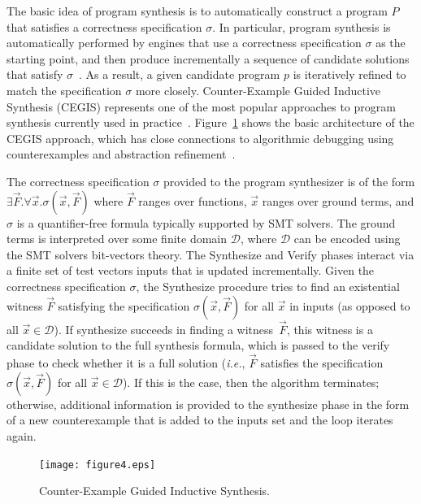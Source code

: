 \documentclass{acm_sen_article}
\begin{document}
The basic idea of program synthesis is to automatically construct a program $P$ that satisfies a correctness specification $\sigma$. In particular, program synthesis is automatically performed by engines that use a correctness specification $\sigma$ as the starting point, and then produce incrementally a sequence of candidate solutions that satisfy $\sigma$~\cite{Abate17}. As a result, a given candidate program $p$ is iteratively refined to match the specification $\sigma$ more closely. Counter-Example Guided Inductive Synthesis (CEGIS) represents one of the most popular approaches to program synthesis currently used in practice~\cite{David15}. Figure~\ref{Counter-Example-Guided-Inductive-Synthesis} shows the basic architecture of the CEGIS approach, which has close connections to algorithmic debugging using counterexamples and abstraction refinement~\cite{Alur13}. 

The correctness specification $\sigma$ provided to the program synthesizer is of the form $\exists \vec{F} .  \forall \vec{x}.  \sigma(\vec{x}, \vec{F})$ where $\vec{F}$ ranges over functions, $\vec{x}$ ranges over ground terms, and $\sigma$ is a quantifier-free formula typically supported by SMT solvers. The ground terms is interpreted over some finite domain $\mathcal{D}$, where $\mathcal{D}$ can be encoded using the SMT solvers bit-vectors theory. The {\sc Synthesize} and {\sc Verify} phases interact via a finite set of test vectors {\sc inputs} that is updated incrementally. Given the correctness specification $\sigma$, the {\sc Synthesize} procedure tries to find an existential witness $\vec{F}$ satisfying the specification $\sigma(\vec{x}, \vec{F})$ for all $\vec{x}$ in {\sc inputs} (as opposed to all $\vec{x} \in \mathcal{D}$). If {\sc synthesize} succeeds in finding a witness~$\vec{F}$, this witness is a candidate solution to the full synthesis formula, which is passed to the {\sc verify} phase to check whether it is a full solution ({\it i.e.}, $\vec{F}$ satisfies the specification $\sigma(\vec{x}, \vec{F})$ for all $\vec{x}\in\mathcal{D}$). If this is the case, then the algorithm terminates; otherwise, additional information is provided to the {\sc synthesize} phase in the form of a new counterexample that is added to the {\sc inputs} set and the loop iterates again. 
%
\begin{figure}[h]
	\centering
	\texttt{[image: figure4.eps]}
	\caption{Counter-Example Guided Inductive Synthesis.}
	\label{Counter-Example-Guided-Inductive-Synthesis}
\end{figure}
\end{document}
